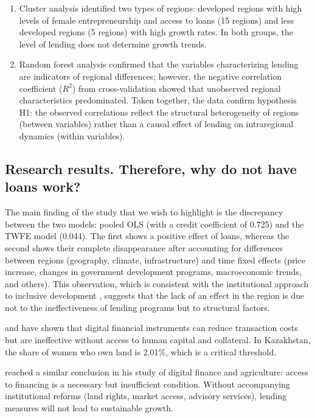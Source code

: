 ﻿\documentclass[pdflatex,sn-mathphys-ay]{sn-jnl}
\begin{document}
\begin{enumerate}
\item Cluster analysis identified two types of regions: developed
regions with high levels of female entrepreneurship and access to loans
(15 regions) and less developed regions (5 regions) with high growth
rates. In both groups, the level of lending does not determine growth
trends.

\item Random forest analysis confirmed that the variables characterizing
lending are indicators of regional differences; however, the negative
correlation coefficient ($R^2$) from cross-validation showed that
unobserved regional characteristics predominated. Taken together, the
data confirm hypothesis H1: the observed correlations reflect the
structural heterogeneity of regions (between variables) rather than a
causal effect of lending on intraregional dynamics (within variables).
\end{enumerate}

\subsection{Research results. Therefore, why do not have loans work?}

The main finding of the study that we wish to highlight is the
discrepancy between the two models: pooled OLS (with a credit
coefficient of 0.725) and the TWFE model (0.044). The first shows a
positive effect of loans, whereas the second shows their complete
disappearance after accounting for differences between regions
(geography, climate, infrastructure) and time fixed effects (price
increase, changes in government development programs, macroeconomic
trends, and others). This observation, which is consistent with the institutional
approach to inclusive development \citep{ref78,ref90}, suggests that the lack of an effect in the
region is due not to the ineffectiveness of lending programs but to
structural factors.

\citet{ref18} and \citet{ref56} have shown that digital
financial instruments can reduce transaction costs but are ineffective
without access to human capital and collateral. In Kazakhstan, the share
of women who own land is 2.01\%, which is a critical threshold.

\citet{ref43} reached a similar conclusion in his study of
digital finance and agriculture: access to financing is a necessary but
insufficient condition. Without accompanying institutional reforms (land
rights, market access, advisory services), lending measures will not
lead to sustainable growth.
\end{document}
